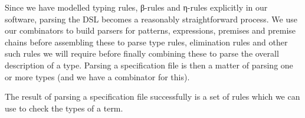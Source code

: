 {\begin{code}
\>[0]\AgdaSpace{}%
\AgdaSpace{}%
\AgdaSpace{}%
\AgdaSpace{}%
\AgdaSymbol{(}\AgdaSymbol{)}\<%
\\
\>[0]\AgdaSpace{}%
\AgdaSpace{}%
\AgdaSpace{}%
\<%
\\
\>[0]\AgdaSpace{}%
\AgdaSpace{}%
\<%
\\
\>[0]\AgdaSpace{}%
\AgdaSpace{}%
\AgdaSpace{}%
\AgdaSpace{}%
\<%
\\
\>[0]\AgdaSpace{}%
\<%
\\
\>[0]\AgdaSpace{}%
\<%
\end{code}
}

Since we have modelled typing rules, β-rules and η-rules explicitly in our
software, parsing the DSL becomes a reasonably straightforward process. We
use our combinators to build parsers for patterns, expressions, premises and
premise chains before assembling these to parse type rules, elimination rules
and other such rules we will require before finally combining these to parse the
overall description of a type. Parsing a specification file is then a matter
of parsing one or more types (and we have a combinator for this).

The result of parsing a specification file successfully is a set of rules
which we can use to check the types of a term.

